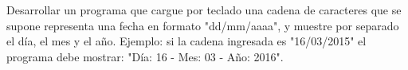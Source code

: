 Desarrollar un programa que cargue por teclado una cadena de caracteres que se supone representa una fecha en
formato "dd/mm/aaaa", y muestre por separado el día, el mes y el año. Ejemplo: si la cadena ingresada es "16/03/2015"
el programa debe mostrar:  "Día: 16  -  Mes:  03  -  Año: 2016".
